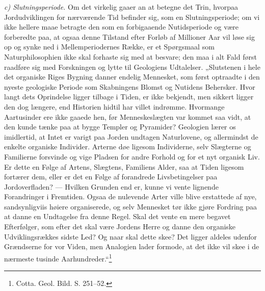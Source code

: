 \documentclass[12pt,a4paper]{book}
\newcommand{\runin}[1]{\emph{#1}\hspace{0.4em}}
\begin{document}
\runin{c) Slutningsperiode.} Om det virkelig gaaer an at betegne det Trin,
hvorpaa Jordudviklingen for nærværende
Tid befinder sig, som en Slutningsperiode; om vi ikke hellere maae betragte
den som en forbigaaende Nutidsperiode og være forberedte paa, at ogsaa denne
Tilstand efter Forløb af Millioner Aar vil løse sig op og synke ned i
Mellemperiodernes Række, er et Spørgsmaal som Naturphilosophien ikke skal
forhaste sig med at besvare; den maa i alt Fald først raadføre sig med
Forskningen og lytte til Geologiens Udtalelser. „Slutstenen i hele det
organiske Riges Bygning danner endelig Mennesket, som først optraadte i den
nyeste geologiske Periode som Skabningens Blomst og Nutidens Behersker. Hvor
langt dets Oprindelse ligger tilbage i Tiden, er ikke bekjendt, men sikkert
ligger den dog længere, end Historien hidtil har villet indrømme. Hvormange
Aartusinder ere ikke gaaede hen, før Menneskeslægten var kommet saa vidt, at
den kunde tænke paa at bygge Templer og Pyramider? Geologien lærer os
imidlertid, at Intet er varigt paa Jorden undtagen Naturlovene, og allermindst
de enkelte organiske Individer. Arterne døe ligesom Individerne, selv
Slægterne og Familierne forsvinde og vige Pladsen for andre Forhold og for et
nyt organisk Liv. Er dette en Følge af Artens, Slægtens, Familiens Alder, saa
at Tiden ligesom fortærer dem, eller er det en Følge af forandrede
Livsbetingelser paa Jordoverfladen? --- Hvilken Grunden end er, kunne vi vente
lignende Forandringer i Fremtiden. Ogsaa de nulevende Arter ville blive
erstattede
af nye, sandsynligviis høiere organiserede, og selv Mennesket tør ikke gjøre
Fordring paa at danne en Undtagelse fra denne Regel. Skal det vente en mere
begavet Efterfølger, som efter det skal være Jordens Herre og danne den
organiske Udviklingsrækkes sidste Led? Og naar skal dette skee? Det ligger
aldeles udenfor Grændserne for vor Viden, men Analogien lader formode, at det
ikke vil skee i de nærmeste tusinde
Aarhundreder.“\footnote{%
Cotta. Geol. Bild. S. 251--52.}
\end{document}
